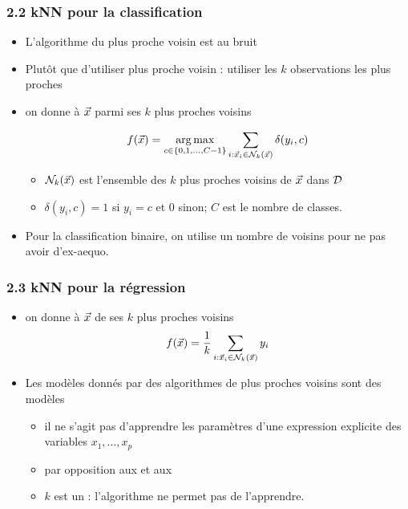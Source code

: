 \begin{frame}
  \frametitle{2.2 kNN pour la classification}
  \begin{itemize}
  \item L'algorithme du plus proche voisin est  au bruit
  \item Plutôt que d'utiliser  plus proche voisin : utiliser les $k$
    observations les plus proches
  \item {} on donne à $\vec{x}$ 
     parmi ses $k$ plus proches voisins
    \pause
      \begin{mdframed}[hidealllines=true, backgroundcolor=MyLightGrey,
                       fontcolor=MyDarkGrey, leftmargin=-5pt,
                       innerleftmargin=5pt, skipabove=5pt]
    \[ f(\vec{x}) = \operatorname*{arg\,max}_{c \in \{0, 1, \dots, C-1\}} \sum_{i : \vec{x}_i \in \mathcal{N}_k(\vec{x})} \delta(y_i, c) \]
      \begin{itemize}
      \item $\mathcal{N}_k(\vec{x})$ est l'ensemble des $k$ plus proches voisins de $\vec{x}$ dans $\mathcal{D}$
      \item $\delta(y_i, c) = 1$ si $y_i = c$ et $0$ sinon; $C$ est le nombre de classes.
      \end{itemize}
    \end{mdframed}
  \pause
  \item Pour la classification binaire, on utilise un nombre  de voisins pour ne pas avoir d'ex-aequo.
  \end{itemize}
\end{frame}

\begin{frame}
  \frametitle{2.3 kNN pour la régression}
  \begin{itemize}
  \item {} on donne à $\vec{x}$ 
     de ses $k$ plus proches voisins
    \[ f(\vec{x}) = \frac1k \sum_{i : \vec{x}_i \in \mathcal{N}_k(\vec{x})} y_i \]
  \end{itemize}
  \pause
    \begin{itemize}
    \item {} Les modèles donnés par des algorithmes de plus
      proches voisins sont des modèles 
      \begin{itemize}
      \item il ne s'agit pas d'apprendre les paramètres d'une expression explicite des variables
        $x_1, \dots, x_p$
      \item par opposition aux  et aux 
      \item $k$ est un  : l'algorithme ne permet pas de l'apprendre.
      \end{itemize}
    \end{itemize}
\end{frame}

